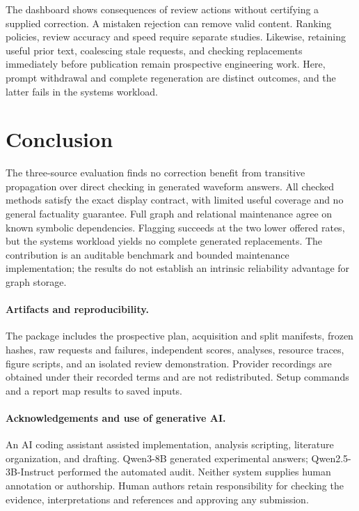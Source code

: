The dashboard shows consequences of review actions without certifying a supplied
correction. A mistaken rejection can remove valid content. Ranking policies,
review accuracy and speed require separate studies. Likewise, retaining useful
prior text, coalescing stale requests, and checking replacements immediately before
publication remain prospective engineering work. Here, prompt withdrawal and
complete regeneration are distinct outcomes, and the latter fails in the systems
workload.

\section{Conclusion}

The three-source evaluation finds no correction benefit from transitive
propagation over direct checking in generated waveform answers. All checked
methods satisfy the exact display contract, with limited useful coverage and
no general factuality guarantee. Full graph and relational maintenance agree on
known symbolic dependencies. Flagging succeeds at the two lower offered rates,
but the systems workload yields no complete generated replacements. The
contribution is an auditable benchmark and bounded maintenance implementation;
the results do not establish an intrinsic reliability advantage for graph storage.

\paragraph{Artifacts and reproducibility.}
The package includes the prospective plan, acquisition and split manifests,
frozen hashes, raw requests and failures, independent scores, analyses, resource
traces, figure scripts, and an isolated review demonstration. Provider recordings
are obtained under their recorded terms and are not redistributed. Setup commands
and a report map results to saved inputs.

\paragraph{Acknowledgements and use of generative AI.}
An AI coding assistant assisted implementation, analysis scripting, literature
organization, and drafting. Qwen3-8B generated experimental answers;
Qwen2.5-3B-Instruct performed the automated audit. Neither system supplies human
annotation or authorship. Human authors retain responsibility for checking the
evidence, interpretations and references and approving any submission.
